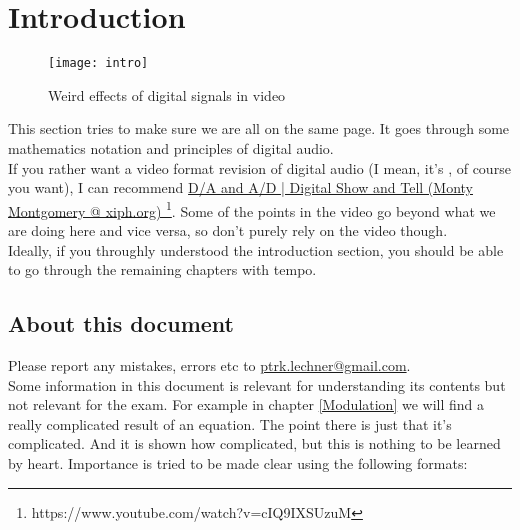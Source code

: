 
\chapter{Introduction}
\label{introduction}

\begin{figure}[h!]
	\centering
	\texttt{[image: intro]}
	\caption[shortCaption]
	{Weird effects of digital signals in video}
	\label{fig:label}
\end{figure}

\clearpage

This section tries to make sure we are all on the same page. It goes through some mathematics notation and principles of digital audio.\\
If you rather want a video format revision of digital audio (I mean, it's \the\year, of course you want), I can recommend \href{https://www.youtube.com/watch?v=cIQ9IXSUzuM}{D/A and A/D | Digital Show and Tell (Monty Montgomery @ xiph.org) }\footnote{https://www.youtube.com/watch?v=cIQ9IXSUzuM}. Some of the points in the video go beyond what we are doing here and vice versa, so don't purely rely on the video though. \\
Ideally, if you throughly understood the introduction section, you should be able to go through the remaining chapters with tempo.\\

\section{About this document}
Please report any mistakes, errors etc to \href{mailto:ptrk.lechner@gmail.com}{ptrk.lechner@gmail.com}.\\

Some information in this document is relevant for understanding its contents but not relevant for the exam. For example in chapter \ref{Modulation} we will find a really complicated result of an equation. The point there is just that it's complicated. And it is shown how complicated, but this is nothing to be learned by heart. Importance is tried to be made clear using the following formats:\\



